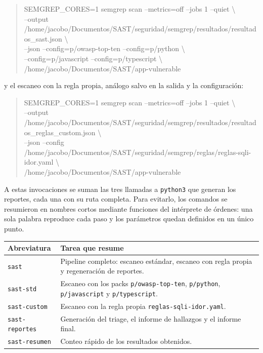 \documentclass[11pt,letterpaper]{article}
\newcommand{\f}[1]{\texttt{#1}}
\newcommand{\enc}[1]{\textbf{#1}}
\begin{document}
\begin{quote}\small\ttfamily
SEMGREP\_CORES=1 semgrep scan --metrics=off --jobs 1 --quiet \textbackslash\\
\hspace*{1em}--output /home/jacobo/Documentos/SAST/seguridad/semgrep/resultados/resultados\_sast.json \textbackslash\\
\hspace*{1em}--json --config=p/owasp-top-ten --config=p/python \textbackslash\\
\hspace*{1em}--config=p/javascript --config=p/typescript \textbackslash\\
\hspace*{1em}/home/jacobo/Documentos/SAST/app-vulnerable
\end{quote}

y el escaneo con la regla propia, análogo salvo en la salida y la configuración:

\begin{quote}\small\ttfamily
SEMGREP\_CORES=1 semgrep scan --metrics=off --jobs 1 --quiet \textbackslash\\
\hspace*{1em}--output /home/jacobo/Documentos/SAST/seguridad/semgrep/resultados/resultados\_reglas\_custom.json \textbackslash\\
\hspace*{1em}--json --config /home/jacobo/Documentos/SAST/seguridad/semgrep/reglas/reglas-sqli-idor.yaml \textbackslash\\
\hspace*{1em}/home/jacobo/Documentos/SAST/app-vulnerable
\end{quote}

A estas invocaciones se suman las tres llamadas a \f{python3} que generan los reportes, cada una con su ruta completa. Para evitarlo, los comandos se resumieron en nombres cortos mediante funciones del intérprete de órdenes: una sola palabra reproduce cada paso y los parámetros quedan definidos en un único punto.

\begin{center}
\begin{tabularx}{\textwidth}{@{}lX@{}}
\toprule
\enc{Abreviatura} & \enc{Tarea que resume} \\
\midrule
\f{sast} & Pipeline completo: escaneo estándar, escaneo con regla propia y regeneración de reportes. \\
\f{sast-std} & Escaneo con los packs \f{p/owasp-top-ten}, \f{p/python}, \f{p/javascript} y \f{p/typescript}. \\
\f{sast-custom} & Escaneo con la regla propia \f{reglas-sqli-idor.yaml}. \\
\f{sast-reportes} & Generación del triage, el informe de hallazgos y el informe final. \\
\f{sast-resumen} & Conteo rápido de los resultados obtenidos. \\
\bottomrule
\end{tabularx}
\end{center}
\end{document}
